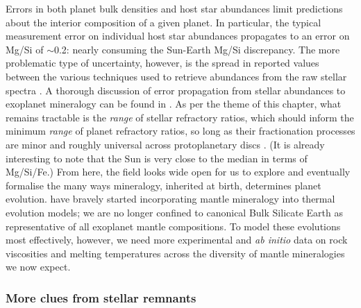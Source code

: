 Errors in both planet bulk densities and host star abundances limit predictions about the interior composition of a given planet. In particular, the typical measurement error on individual host star abundances \citet{hinkel_star_2018} propagates to an error on Mg/Si of $\sim$0.2: nearly consuming the Sun-Earth Mg/Si discrepancy. The more problematic type of uncertainty, however, is the spread in reported values between the various techniques used to retrieve abundances from the raw stellar spectra \citep{hinkel_comparison_2016}. A thorough discussion of error propagation from stellar abundances to exoplanet mineralogy can be found in \citet{hinkel_star_2018}. As per the theme of this chapter, what remains tractable is the \textit{range} of stellar refractory ratios, which should inform the minimum \textit{range} of planet refractory ratios, so long as their fractionation processes are minor and roughly universal across protoplanetary discs \citep{bond_compositional_2010, thiabaud_elemental_2015}. (It is already interesting to note that the Sun is very close to the median in terms of Mg/Si/Fe.) From here, the field looks wide open for us to explore and eventually formalise the many ways mineralogy, inherited at birth, determines planet evolution. %
\citet{spaargaren_influence_2020} have bravely started incorporating mantle mineralogy into thermal evolution models; we are no longer confined to canonical Bulk Silicate Earth as representative of all exoplanet mantle compositions. To model these evolutions most effectively, however, we need more experimental and \textit{ab initio} data on rock viscosities and melting temperatures across the diversity of mantle mineralogies we now expect.  




\subsubsection{More clues from stellar remnants}
\label{sec:background-pwd}



